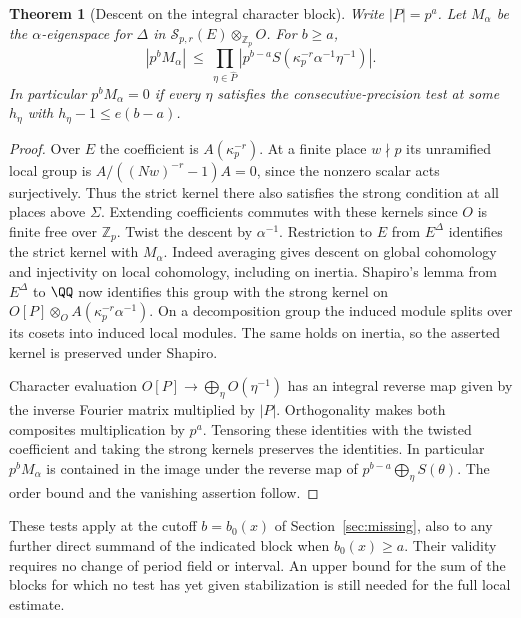 \documentclass[a4paper,11pt]{article}
\newtheorem{theorem}[proposition]{Theorem}
\theoremstyle{definition}
\theoremstyle{remark}
\newcommand{\ZZ}{\mathbb Z}\newcommand{\ord}{\operatorname{ord}}
\numberwithin{equation}{section}
\begin{document}
\begin{theorem}[Descent on the integral character block]
\leavevmode\label{thm:integralblock656}
Write \(|P|=p^a\). Let \(M_\alpha\) be the \(\alpha\)-eigenspace
for \(\Delta\) in \(\mathcal S_{p,r}(E)\otimes_{\ZZ_p}O\).
For \(b\ge a\),
\[
       |p^b M_\alpha|
         \ \le\ \prod_{\eta\in\widehat P}
                  |p^{b-a}S(\kappa_p^{-r}\alpha^{-1}\eta^{-1})|.
\]
In particular \(p^bM_\alpha=0\) if every \(\eta\) satisfies
the consecutive-precision test at some \(h_\eta\) with
\(h_\eta-1\le e(b-a)\).
\end{theorem}
\begin{proof}
Over \(E\) the coefficient is \(A(\kappa_p^{-r})\).
At a finite place \(w\nmid p\) its unramified local group
is \(A/((Nw)^{-r}-1)A=0\), since the nonzero scalar acts
surjectively. Thus the strict kernel there also satisfies the
strong condition at all places above \(\Sigma\). Extending
coefficients commutes with these kernels since \(O\) is finite
free over \(\ZZ_p\). Twist the descent by \(\alpha^{-1}\).
Restriction to \(E\) from \(E^\Delta\) identifies the strict
kernel with \(M_\alpha\). Indeed averaging gives descent on global
cohomology and injectivity on local cohomology, including on
inertia. Shapiro's lemma from \(E^\Delta\) to \(\QQ\) now
identifies this group with the strong kernel on
\(O[P]\otimes_O A(\kappa_p^{-r}\alpha^{-1})\). On a decomposition
group the induced module splits over its cosets into induced
local modules. The same holds on inertia, so the asserted kernel
is preserved under Shapiro.

Character evaluation \(O[P]\to\bigoplus_\eta O(\eta^{-1})\)
has an integral reverse map given by the inverse Fourier matrix
multiplied by \(|P|\). Orthogonality makes both composites
multiplication by \(p^a\). Tensoring these identities with the
twisted coefficient and taking the strong kernels preserves the
identities. In particular \(p^b M_\alpha\) is contained in the
image under the reverse map of \(p^{b-a}\bigoplus_\eta S(\theta)\).
The order bound and the vanishing assertion follow.
\end{proof}

These tests apply at the cutoff \(b=b_0(x)\) of
Section~\ref{sec:missing}, also to any further direct summand
of the indicated block when \(b_0(x)\ge a\). Their validity requires no change of
period field or interval. An upper bound for the sum of the
blocks for which no test has yet given stabilization is still
needed for the full local estimate.
\end{document}
